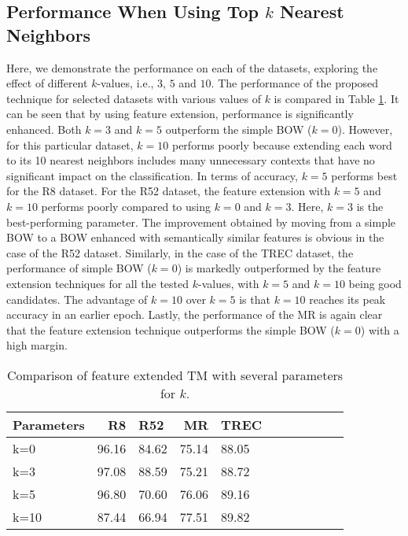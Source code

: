 \documentclass[11pt]{article}
\begin{document}
\subsection{Performance When Using Top $k$ Nearest Neighbors}
Here, we demonstrate the performance on each of the datasets, exploring the effect of different $k$-values, i.e., $3$, $5$ and $10$. The performance of the proposed technique for selected datasets with various values of $k$ is compared in Table \ref{table55}. It can be seen that by using feature extension, performance is significantly enhanced. Both $k=3$ and $k = 5$ outperform the simple BOW ($k=0$). However, for this particular dataset, $k=10$ performs poorly because extending each word to its 10 nearest neighbors includes many unnecessary contexts that have no significant impact on the classification. In terms of accuracy, $k=5$ performs best for the R8 dataset. For the R52 dataset, the feature extension with $k=5$ and $k=10$ performs poorly compared to using $k=0$ and $k=3$. Here, $k=3$ is the best-performing parameter. The improvement obtained by moving from a simple BOW to a BOW enhanced with semantically similar features is obvious in the case of the R52 dataset. Similarly, in the case of the TREC dataset, the performance of simple BOW ($k=0$) is markedly outperformed by the feature extension techniques for all the tested $k$-values, with $k=5$ and $k=10$ being good candidates. The advantage of $k=10$ over $k=5$ is that $k=10$ reaches its peak accuracy  in an earlier epoch. Lastly, the performance of the MR is again clear that the feature extension technique outperforms the simple BOW ($k=0$) with a high margin.
\begin{table}
\centering
\begin{tabular}{lrlrlrlrlrl}
\hline \textbf{Parameters} & \textbf{R8} & \textbf{R52} & \textbf{MR} & \textbf{TREC} \\ \hline
k=0 & 96.16 & 84.62 & 75.14  & 88.05 \\
k=3 & 97.08 & 88.59 & 75.21  & 88.72 \\
k=5 & 96.80 & 70.60 & 76.06  & 89.16 \\
k=10 & 87.44 & 66.94 & 77.51  & 89.82 \\
\hline  
\end{tabular}
\caption{\label{table55} Comparison of feature extended TM with several parameters for $k$.}
\end{table}
\end{document}
